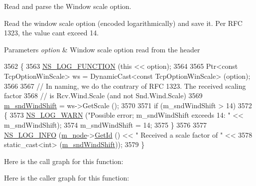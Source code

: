 Read and parse the Window scale option. 

Read the window scale option (encoded logarithmically) and save it. Per R\+FC 1323, the value can\textquotesingle{}t exceed 14.


\begin{DoxyParams}{Parameters}
{\em option} & Window scale option read from the header \\
\hline
\end{DoxyParams}

\begin{DoxyCode}
3562 \{
3563   \hyperlink{log-macros-disabled_8h_a90b90d5bad1f39cb1b64923ea94c0761}{NS\_LOG\_FUNCTION} (\textcolor{keyword}{this} << option);
3564 
3565   Ptr<const TcpOptionWinScale> ws = DynamicCast<const TcpOptionWinScale> (option);
3566 
3567   \textcolor{comment}{// In naming, we do the contrary of RFC 1323. The received scaling factor}
3568   \textcolor{comment}{// is Rcv.Wind.Scale (and not Snd.Wind.Scale)}
3569   \hyperlink{classns3_1_1TcpSocketBase_a249576feb9975ab927aeeda274d9bef0}{m\_sndWindShift} = ws->GetScale ();
3570 
3571   \textcolor{keywordflow}{if} (m\_sndWindShift > 14)
3572     \{
3573       \hyperlink{group__logging_gade7208b4009cdf0e25783cd26766f559}{NS\_LOG\_WARN} (\textcolor{stringliteral}{"Possible error; m\_sndWindShift exceeds 14: "} << m\_sndWindShift);
3574       m\_sndWindShift = 14;
3575     \}
3576 
3577   \hyperlink{group__logging_gafbd73ee2cf9f26b319f49086d8e860fb}{NS\_LOG\_INFO} (\hyperlink{classns3_1_1TcpSocketBase_abefd2b9f439fe5d0deef93ee68884a1e}{m\_node}->\hyperlink{classns3_1_1Node_aaf49b64a843565ce3812326313b370ac}{GetId} () << \textcolor{stringliteral}{" Received a scale factor of "} <<
3578                \textcolor{keyword}{static\_cast<}\textcolor{keywordtype}{int}\textcolor{keyword}{>} (\hyperlink{classns3_1_1TcpSocketBase_a249576feb9975ab927aeeda274d9bef0}{m\_sndWindShift}));
3579 \}
\end{DoxyCode}


Here is the call graph for this function\+:




Here is the caller graph for this function\+:


